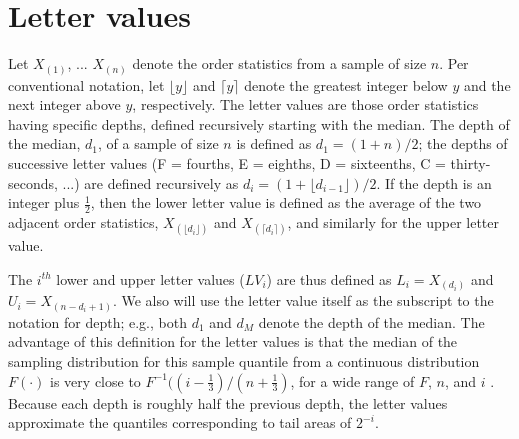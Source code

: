 \documentclass[oneside]{article}
\begin{document}
\section{Letter values}
\label{sec:letter-values}

Let $X_{(1)}$, ... $X_{(n)}$ denote the order statistics from a sample of size $n$. Per conventional notation, let $\lfloor y \rfloor$ and $\lceil y \rceil$ denote the greatest integer below $y$ and the next integer above $y$, respectively. The letter values are those order statistics having specific depths, defined recursively starting with the median. The depth of the median, $d_1$, of a sample of size $n$ is defined as $d_1 = (1 + n )/2$; the depths of successive letter values (F = fourths, E = eighths, D = sixteenths, C = thirty-seconds, ...) are defined recursively as $d_i = (1 + \lfloor d_{i-1} \rfloor)/2$. If the depth is an integer plus $\frac{1}{2}$, then the lower letter value is defined as the average of the two adjacent order statistics, $X_{(\lfloor d_i \rfloor)}$ and $X_{(\lceil d_i \rceil)}$, and similarly for the upper letter value. 

The $i^{th}$ lower and upper letter values ($LV_i$) are thus defined as $L_i = X_{(d_i)}$ and $U_i = X_{(n - d_i + 1)}$. We also will use the letter value itself as the subscript to the notation for depth; e.g., both $d_1$ and $d_M$ denote the depth of the median. The advantage of this definition for the letter values is that the median of the sampling distribution for this sample quantile from a continuous distribution $F(\cdot)$ is very close to $F^{-1} ((i - \frac{1}{3})/(n + \frac{1}{3})$, for a wide range of $F$, $n$, and $i$ \citep{dchlv}. Because each depth is roughly half the previous depth, the letter values approximate the quantiles corresponding to tail areas of $2^{-i}$.
\end{document}
